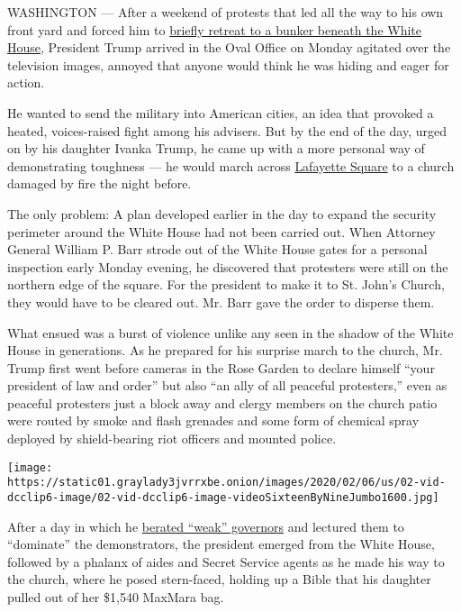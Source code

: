WASHINGTON --- After a weekend of protests that led all the way to his
own front yard and forced him to
\href{https://www.nytimes3xbfgragh.onion/2020/06/03/us/politics/trump-protests.html}{briefly
retreat to a bunker beneath the White House}, President Trump arrived in
the Oval Office on Monday agitated over the television images, annoyed
that anyone would think he was hiding and eager for action.

He wanted to send the military into American cities, an idea that
provoked a heated, voices-raised fight among his advisers. But by the
end of the day, urged on by his daughter Ivanka Trump, he came up with a
more personal way of demonstrating toughness --- he would march across
\href{https://www.nytimes3xbfgragh.onion/2020/07/28/us/politics/lafayette-square-park-police-protests.html}{Lafayette
Square} to a church damaged by fire the night before.

The only problem: A plan developed earlier in the day to expand the
security perimeter around the White House had not been carried out. When
Attorney General William P. Barr strode out of the White House gates for
a personal inspection early Monday evening, he discovered that
protesters were still on the northern edge of the square. For the
president to make it to St. John's Church, they would have to be cleared
out. Mr. Barr gave the order to disperse them.

What ensued was a burst of violence unlike any seen in the shadow of the
White House in generations. As he prepared for his surprise march to the
church, Mr. Trump first went before cameras in the Rose Garden to
declare himself ``your president of law and order'' but also ``an ally
of all peaceful protesters,'' even as peaceful protesters just a block
away and clergy members on the church patio were routed by smoke and
flash grenades and some form of chemical spray deployed by
shield-bearing riot officers and mounted police.

\texttt{[image: https://static01.graylady3jvrrxbe.onion/images/2020/02/06/us/02-vid-dcclip6-image/02-vid-dcclip6-image-videoSixteenByNineJumbo1600.jpg]}

After a day in which he
\href{https://www.nytimes3xbfgragh.onion/2020/06/01/us/politics/trump-governors.html}{berated
``weak'' governors} and lectured them to ``dominate'' the demonstrators,
the president emerged from the White House, followed by a phalanx of
aides and Secret Service agents as he made his way to the church, where
he posed stern-faced, holding up a Bible that his daughter pulled out of
her \$1,540 MaxMara bag.

